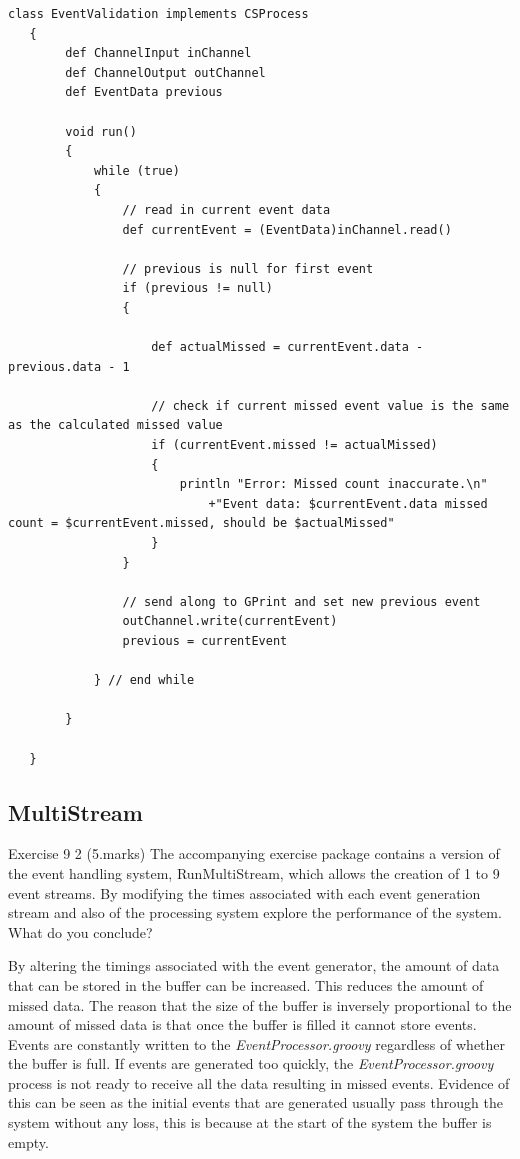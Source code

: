 \documentclass[10pt, a4paper]{article}
\begin{document}
   \begin{lstlisting}[caption = "EventValidation.groovy" \label{lst:event}]
   class EventValidation implements CSProcess
   {
   	  	def ChannelInput inChannel
      	def ChannelOutput outChannel
      	def EventData previous
   
   	  	void run()
   	  	{
   	    	while (true)
   		 	{
   				// read in current event data
 				def currentEvent = (EventData)inChannel.read()
   
   				// previous is null for first event
   				if (previous != null)
   	 			{
   
   		 			def actualMissed = currentEvent.data - previous.data - 1
   
   					// check if current missed event value is the same as the calculated missed value
	   				if (currentEvent.missed != actualMissed)
   					{
   						println "Error: Missed count inaccurate.\n"
   							+"Event data: $currentEvent.data missed count = $currentEvent.missed, should be $actualMissed"
   					}
   				}
   
   				// send along to GPrint and set new previous event
   				outChannel.write(currentEvent)
   				previous = currentEvent	
   								
  			} // end while
   
   		}
   
   }   \end{lstlisting}
   \subsection{MultiStream}
   Exercise 9 2   (5.marks)
   The accompanying exercise package contains a version of the event handling system, RunMultiStream, which allows the creation of 1 to 9 event streams.  By modifying the times associated with each event generation stream and also of the processing system explore the performance of the system.  What do you conclude?
   
   By altering the timings associated with the event generator, the amount of data that can be stored in the buffer can be increased. This reduces the amount of missed data. The reason that the size of the buffer is inversely proportional to the amount of missed data is that once the buffer is filled it cannot store events. Events are constantly written to the \textit{EventProcessor.groovy} regardless of whether the buffer is full. If events are generated too quickly, the  \textit{EventProcessor.groovy} process is not ready to receive all the data resulting in missed events. Evidence of this can be seen as the initial events that are generated usually pass through the system without any loss, this is because at the start of the system the buffer is empty. 
   
\end{document}
